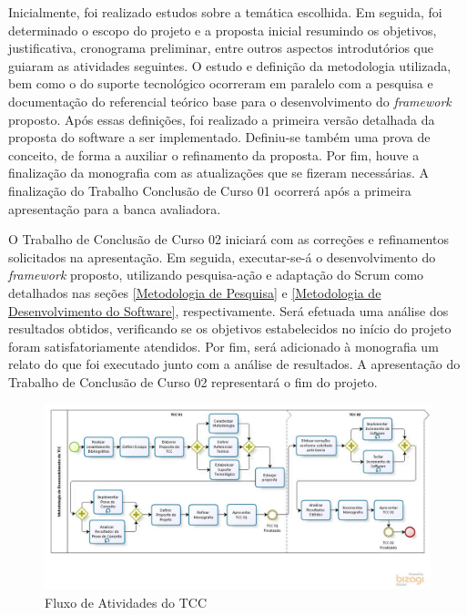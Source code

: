  \par
 \indent Inicialmente, foi realizado estudos sobre a temática escolhida. Em seguida, foi determinado o escopo do projeto e a proposta inicial resumindo os objetivos, justificativa, cronograma preliminar, entre outros aspectos introdutórios que guiaram as atividades seguintes. O estudo e definição  da metodologia utilizada, bem como o do suporte tecnológico ocorreram em paralelo com a pesquisa e documentação do referencial teórico base para o desenvolvimento do \textit{framework} proposto. Após essas definições, foi realizado a primeira versão detalhada da proposta do software a ser implementado. Definiu-se também uma prova de conceito, de forma a auxiliar o refinamento da proposta. Por fim, houve a finalização da monografia com as atualizações que se fizeram necessárias. A finalização do Trabalho Conclusão de Curso 01 ocorrerá após a primeira apresentação para a banca avaliadora.
 \par
 \indent O Trabalho de Conclusão de Curso 02 iniciará com as correções e refinamentos solicitados na apresentação. Em seguida,  executar-se-á o desenvolvimento do \textit{framework} proposto, utilizando pesquisa-ação e adaptação do Scrum como detalhados nas seções \ref{Metodologia de Pesquisa} e  \ref{Metodologia de Desenvolvimento do Software}, respectivamente. Será efetuada uma análise dos resultados obtidos, verificando se os objetivos estabelecidos no início do projeto foram satisfatoriamente atendidos. Por fim, será adicionado à monografia um relato do que foi executado junto com a análise de resultados.  A apresentação do Trabalho de Conclusão de Curso 02 representará o fim do projeto.
 	
  \begin{figure}[h]
    \centering
    \includegraphics[width=\textwidth]{figuras/processo.jpg}
    \caption{Fluxo de Atividades do TCC}
    \label{fig:processo}
  \end{figure}
 
